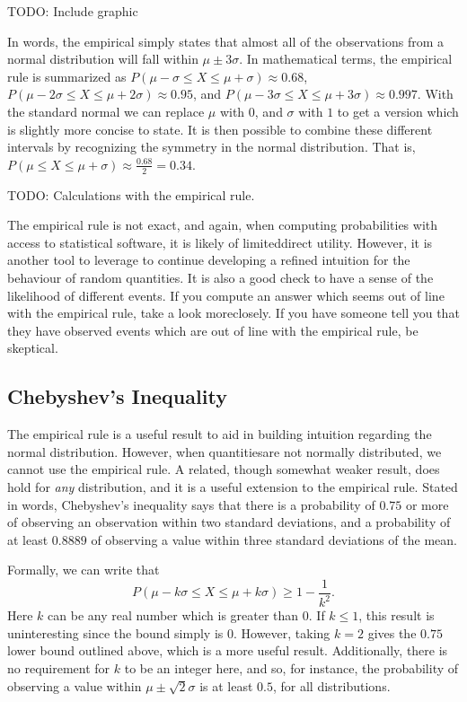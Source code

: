 \documentclass[
  letterpaper,
  DIV=11,
  numbers=noendperiod]{scrreprt}
\begin{document}
TODO: Include graphic

In words, the empirical simply states that almost all of the
observations from a normal distribution will fall within
\(\mu\pm3\sigma\). In mathematical terms, the empirical rule is
summarized as \(P(\mu-\sigma\leq X \leq \mu + \sigma) \approx 0.68\),
\(P(\mu - 2\sigma \leq X \leq \mu + 2\sigma) \approx 0.95\), and
\(P(\mu - 3\sigma \leq X \leq \mu + 3\sigma) \approx 0.997\). With the
standard normal we can replace \(\mu\) with \(0\), and \(\sigma\) with
\(1\) to get a version which is slightly more concise to state. It is
then possible to combine these different intervals by recognizing the
symmetry in the normal distribution. That is,
\(P(\mu \leq X \leq \mu + \sigma) \approx \frac{0.68}{2} = 0.34\).

TODO: Calculations with the empirical rule.

The empirical rule is not exact, and again, when computing probabilities
with access to statistical software, it is likely of limiteddirect
utility. However, it is another tool to leverage to continue developing
a refined intuition for the behaviour of random quantities. It is also a
good check to have a sense of the likelihood of different events. If you
compute an answer which seems out of line with the empirical rule, take
a look moreclosely. If you have someone tell you that they have observed
events which are out of line with the empirical rule, be skeptical.

\subsection{Chebyshev's Inequality}\label{chebyshevs-inequality}

The empirical rule is a useful result to aid in building intuition
regarding the normal distribution. However, when quantitiesare not
normally distributed, we cannot use the empirical rule. A related,
though somewhat weaker result, does hold for \emph{any} distribution,
and it is a useful extension to the empirical rule. Stated in words,
Chebyshev's inequality says that there is a probability of \(0.75\) or
more of observing an observation within two standard deviations, and a
probability of at least \(0.8889\) of observing a value within three
standard deviations of the mean.

Formally, we can write that
\[P(\mu - k\sigma \leq X \leq \mu + k\sigma) \geq 1 - \frac{1}{k^2}.\]
Here \(k\) can be any real number which is greater than \(0\). If
\(k\leq 1\), this result is uninteresting since the bound simply is
\(0\). However, taking \(k=2\) gives the \(0.75\) lower bound outlined
above, which is a more useful result. Additionally, there is no
requirement for \(k\) to be an integer here, and so, for instance, the
probability of observing a value within \(\mu\pm\sqrt{2}\sigma\) is at
least \(0.5\), for all distributions.
\end{document}
